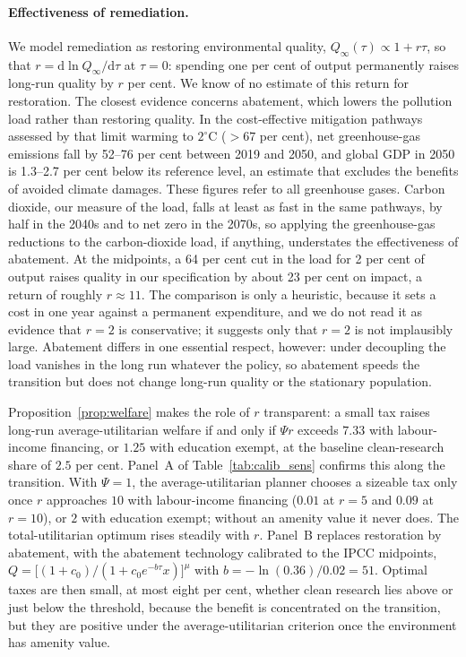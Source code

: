 \documentclass[11pt]{article}
\begin{document}
\paragraph{Effectiveness of remediation.}
We model remediation as restoring environmental quality, $Q_\infty(\tau)\propto1+r\tau$, so that
$r=\mathrm{d}\ln Q_\infty/\mathrm{d}\tau$ at $\tau=0$: spending one per cent of output permanently raises
long-run quality by $r$ per cent. We know of no estimate of this return for restoration. The closest
evidence concerns abatement, which lowers the pollution load rather than restoring quality. In the
cost-effective mitigation pathways assessed by \citet{riahi2022} that limit warming to $2^\circ$C
($>67$ per cent), net greenhouse-gas emissions fall by 52--76 per cent between 2019 and 2050, and global
GDP in 2050 is 1.3--2.7 per cent below its reference level, an estimate that excludes the benefits of
avoided climate damages. These figures refer to all greenhouse gases. Carbon dioxide, our measure of the
load, falls at least as fast in the same pathways, by half in the 2040s and to net zero in the 2070s,
so applying the greenhouse-gas reductions to the carbon-dioxide load, if anything, understates the
effectiveness of abatement. At the midpoints, a 64 per cent cut in the load for 2 per cent of output
raises quality in our specification by about 23 per cent on impact, a return of roughly $r\approx11$. The
comparison is only a heuristic, because it sets a cost in one year against a permanent expenditure, and
we do not read it as evidence that $r=2$ is conservative; it suggests only that $r=2$ is not implausibly
large. Abatement differs in one essential
respect, however: under decoupling the load vanishes in the long run whatever the policy, so abatement
speeds the transition but does not change long-run quality or the stationary population.

Proposition~\ref{prop:welfare} makes the role of $r$ transparent: a small tax raises long-run
average-utilitarian welfare if and only if $\Psi r$ exceeds $7.33$ with labour-income financing, or $1.25$
with education exempt, at the baseline clean-research share of $2.5$ per cent. Panel~A of Table~\ref{tab:calib_sens} confirms this along the transition. With
$\Psi=1$, the average-utilitarian planner chooses a sizeable tax only once $r$ approaches $10$ with
labour-income financing ($0.01$ at $r=5$ and $0.09$ at $r=10$), or $2$ with education exempt; without an
amenity value it never does. The
total-utilitarian optimum rises steadily with $r$. Panel~B replaces restoration by abatement, with the
abatement technology calibrated to the IPCC midpoints, $Q=\big[(1+c_0)/(1+c_0e^{-b\tau}x)\big]^{\mu}$ with
$b=-\ln(0.36)/0.02=51$. Optimal taxes are then small, at most eight per cent, whether clean research
lies above or just below the threshold, because the benefit is concentrated on the transition, but they
are positive under the average-utilitarian criterion once the environment has amenity value.
\end{document}
